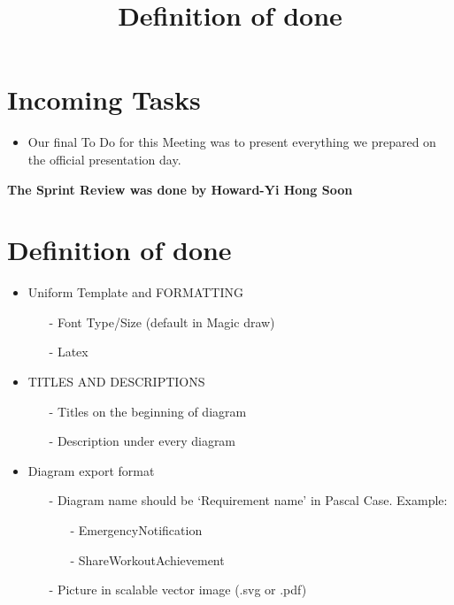 \documentclass{article}
\begin{document}
\section*{Incoming Tasks}
\begin{itemize}
	\item Our final To Do for this Meeting was to present everything we prepared on the official presentation day.
\end{itemize}
\noindent
\textbf{The Sprint Review was done by Howard-Yi Hong Soon}
\newpage

\section{Definition of done}
\title{Definition of done}
\begin{itemize}
\item
  Uniform Template and FORMATTING
  \begin{itemize} 
	\item[-]Font Type/Size (default in Magic draw)
	\item[-]Latex
	\end{itemize}
\end{itemize}

\begin{itemize}
\item
  TITLES AND DESCRIPTIONS
 	\begin{itemize} 
 	\item[-]Titles on the beginning of diagram
  	\item[-] Description under every diagram
	\end{itemize}
\end{itemize}

\begin{itemize}
\item
  Diagram export format
  \begin{itemize}
	\item[-] Diagram name should be ‘Requirement name’ in Pascal Case. Example:
		\begin{itemize}
			\item[-] EmergencyNotification
			\item[-] ShareWorkoutAchievement
		\end{itemize}
	\item[-]Picture in scalable vector image (.svg or .pdf)
	\end{itemize}
\end{itemize}
\end{document}
